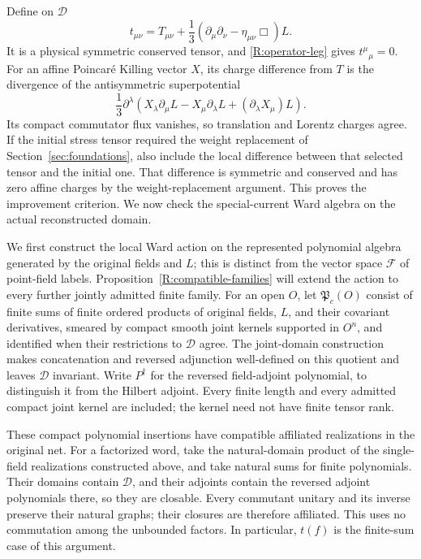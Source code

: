 Define on $\mathcal D$
\begin{equation}\label{R:improvement}
 t_{\mu\nu}=T_{\mu\nu}
       +\frac13(\partial_\mu\partial_\nu
                        -\eta_{\mu\nu}\Box)L.
\end{equation}
It is a physical symmetric conserved tensor, and
\eqref{R:operator-leg} gives $t^\mu{}_{\mu}=0$.
For an affine Poincar\'e Killing vector $X$, its charge difference
from $T$ is the divergence of the antisymmetric superpotential
\begin{equation}\label{R:superpotential}
 \frac13\partial^\lambda
 \left(X_\lambda\partial_\mu L-X_\mu\partial_\lambda L
                              +(\partial_\lambda X_\mu)L\right).
\end{equation}
Its compact commutator flux vanishes, so translation and Lorentz
charges agree.  If the initial stress tensor required the weight replacement of
Section~\ref{sec:foundations}, also include the local difference
between that selected tensor and the initial one.  That difference
is symmetric and conserved and has zero affine charges by the
weight-replacement argument.  This proves the improvement criterion.  We now check the special-current Ward algebra on the
actual reconstructed domain.

We first construct the local Ward action on the represented polynomial
algebra generated by the original fields and $L$; this is distinct from
the vector space $\mathcal F$ of point-field labels.
Proposition~\ref{R:compatible-families} will extend the action to every
further jointly admitted finite family.  For an open $O$, let
$\mathfrak P_c(O)$ consist of
finite sums of finite ordered products of original fields, $L$, and their
covariant derivatives, smeared by compact smooth joint kernels supported
in $O^n$, and identified when their restrictions to $\mathcal D$ agree.
The joint-domain construction makes concatenation and reversed adjunction
well-defined on this quotient and leaves $\mathcal D$ invariant.  Write
$P^\dagger$ for the reversed field-adjoint polynomial, to distinguish it
from the Hilbert adjoint.  Every finite length and every admitted compact
joint kernel are included; the kernel need not have finite tensor rank.

These compact polynomial insertions have compatible affiliated
realizations in the original net.  For a factorized word, take the
natural-domain product of the single-field realizations constructed
above, and take natural sums for finite polynomials.  Their domains
contain $\mathcal D$, and their adjoints contain the reversed adjoint
polynomials there, so they are closable.  Every commutant unitary and
its inverse preserve their natural graphs; their closures are therefore
affiliated.  This uses no commutation among the unbounded factors.
In particular, $t(f)$ is the finite-sum case of this argument.

